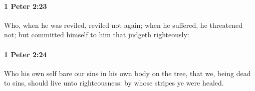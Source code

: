 		\paragraph{1 Peter 2:23} %
			\label{1PETER-2-23}

			Who, when he was reviled, reviled not again; when he suffered, he threatened not; but committed himself to him that judgeth righteously:

			\begin{framed}
			\scriptsize
				\begin{compactdesc}
					\item[SBLG] 
				\end{compactdesc}
			\end{framed}

		\paragraph{1 Peter 2:24} %
			\label{1PETER-2-24}

			Who his own self bare our sins in his own body on the tree, that we, being dead to sins, should live unto righteousness: by whose stripes ye were healed.

